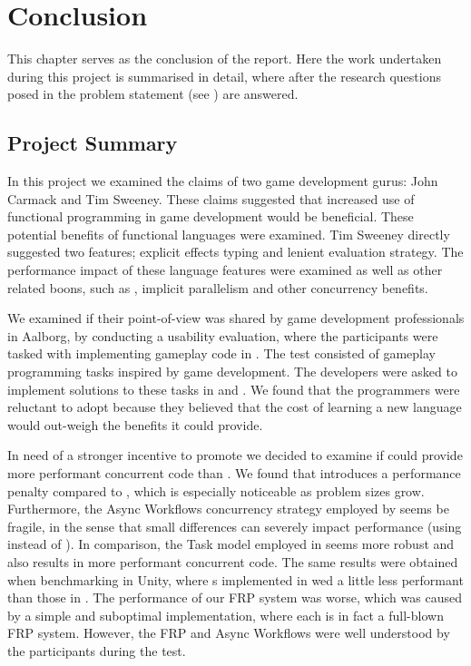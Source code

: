 \chapter{Conclusion}
This chapter serves as the conclusion of the report. Here the work undertaken during this project is summarised in detail, where after the research questions posed in the problem statement (see ) are answered.

\section{Project Summary}
In this project we examined the claims of two game development gurus: John Carmack and Tim Sweeney. These claims suggested that increased use of functional programming in game development would be beneficial. These potential benefits of functional languages were examined. Tim Sweeney directly suggested two features; explicit effects typing and lenient evaluation strategy. The performance impact of these language features were examined as well as other related boons, such as , implicit parallelism and other concurrency benefits.

We examined if their point-of-view was shared by game development professionals in Aalborg, by conducting a usability evaluation, where the participants were tasked with implementing gameplay code in \fs. The test consisted of gameplay programming tasks inspired by game development. The developers were asked to implement solutions to these tasks in \fs and \cs. We found that the programmers were reluctant to adopt \fs because they believed that the cost of learning a new language would out-weigh the benefits it could provide.

In need of a stronger incentive to promote \fs we decided to examine if \fs could provide more performant concurrent code than \cs. We found that \fs introduces a performance penalty compared to \cs, which is especially noticeable as problem sizes grow. Furthermore, the Async Workflows concurrency strategy employed by \fs seems be fragile, in the sense that small differences can severely impact performance (using  instead of ). In comparison, the Task model employed in \cs seems more robust and also results in more performant concurrent code. The same results were obtained when benchmarking \fs in Unity, where s implemented in \fs wed a little less performant than those in \cs. The performance of our \gls{FRP} system was worse, which was caused by a simple and suboptimal implementation, where each  is in fact a full-blown \gls{FRP} system. However, the \gls{FRP} and Async Workflows were well understood by the participants during the test.

